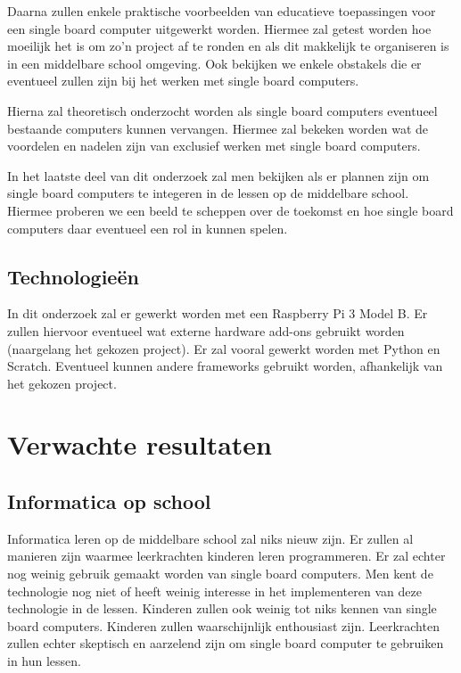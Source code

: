 Daarna zullen enkele praktische voorbeelden van educatieve toepassingen voor een single board computer uitgewerkt worden. Hiermee zal getest worden hoe moeilijk het is om zo'n project af te ronden en als dit makkelijk te organiseren is in een middelbare school omgeving. Ook bekijken we enkele obstakels die er eventueel zullen zijn bij het werken met single board computers.

Hierna zal theoretisch onderzocht worden als single board computers eventueel bestaande computers kunnen vervangen. Hiermee zal bekeken worden wat de voordelen en nadelen zijn van exclusief werken met single board computers.

In het laatste deel van dit onderzoek zal men bekijken als er plannen zijn om single board computers te integeren in de lessen op de middelbare school. Hiermee proberen we een beeld te scheppen over de toekomst en hoe single board computers daar eventueel een rol in kunnen spelen.

\subsection{Technologieën}

In dit onderzoek zal er gewerkt worden met een Raspberry Pi 3 Model B. Er zullen hiervoor eventueel wat externe hardware add-ons gebruikt worden (naargelang het gekozen project). Er zal vooral gewerkt worden met Python en Scratch. Eventueel kunnen andere frameworks gebruikt worden, afhankelijk van het gekozen project.
\section{Verwachte resultaten}
\label{sec:verwachte_resultaten}
\subsection{Informatica op school}
Informatica leren op de middelbare school zal niks nieuw zijn. Er zullen al manieren zijn waarmee leerkrachten kinderen leren programmeren. Er zal echter nog weinig gebruik gemaakt worden van single board computers. Men kent de technologie nog niet of heeft weinig interesse in het implementeren van deze technologie in de lessen. Kinderen zullen ook weinig tot niks kennen van single board computers. Kinderen zullen waarschijnlijk enthousiast zijn. Leerkrachten zullen echter skeptisch en aarzelend zijn om single board computer te gebruiken in hun lessen.

